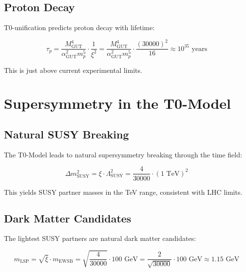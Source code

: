 \documentclass[12pt,a4paper]{report}
\newcommand{\xipar}{\xi}      %
\begin{document}
	\subsection{Proton Decay}\label{subsec:proton_decay}
	
	T0-unification predicts proton decay with lifetime:
	
	\begin{equation}\label{eq:proton_decay}
		\tau_p = \frac{M_{\text{GUT}}^4}{\alpha_{\text{GUT}}^2 m_p^5} \cdot \frac{1}{\xipar^2} = \frac{M_{\text{GUT}}^4}{\alpha_{\text{GUT}}^2 m_p^5} \cdot \frac{(30000)^2}{16} \approx 10^{35} \text{ years}
	\end{equation}
	
	This is just above current experimental limits.
	
	\section{Supersymmetry in the T0-Model}\label{sec:supersymmetry}
	
	\subsection{Natural SUSY Breaking}\label{subsec:natural_susy_breaking}
	
	The T0-Model leads to natural supersymmetry breaking through the time field:
	
	\begin{equation}\label{eq:susy_breaking}
		\Delta m_{\text{SUSY}}^2 = \xipar \cdot \Lambda_{\text{SUSY}}^2 = \frac{4}{30000} \cdot (1 \text{ TeV})^2
	\end{equation}
	
	This yields SUSY partner masses in the TeV range, consistent with LHC limits.
	
	\subsection{Dark Matter Candidates}\label{subsec:dark_matter_candidates}
	
	The lightest SUSY partners are natural dark matter candidates:
	
	\begin{equation}\label{eq:dm_mass}
		m_{\text{LSP}} = \sqrt{\xipar} \cdot m_{\text{EWSB}} = \sqrt{\frac{4}{30000}} \cdot 100 \text{ GeV} = \frac{2}{\sqrt{30000}} \cdot 100 \text{ GeV} \approx 1.15 \text{ GeV}
	\end{equation}
	
\end{document}
